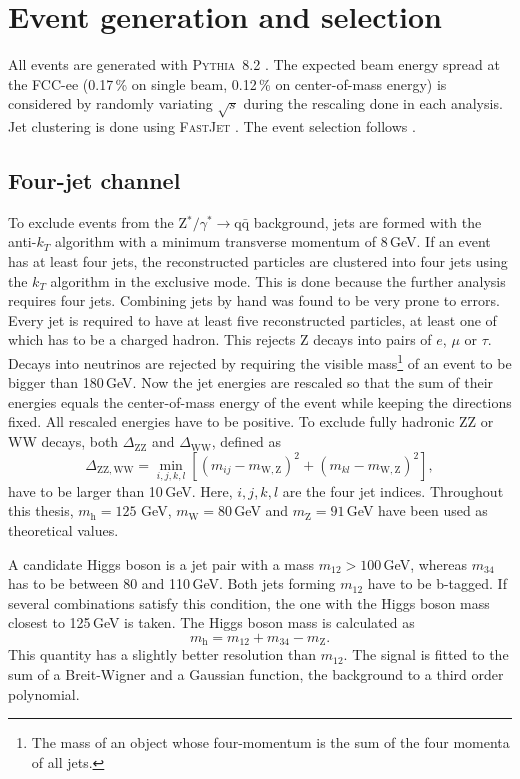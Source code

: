 \section{Event generation and selection}
All events are generated with \textsc{Pythia~8.2} \cite{pythia82}. The expected beam energy spread at the FCC-ee (0.17\,\% on single beam, 0.12\,\% on center-of-mass energy) is considered by randomly variating $\sqrt{s}$ during the rescaling done in each analysis. Jet clustering is done using \textsc{FastJet} \cite{fastjet}.
The event selection follows \cite{lep3-note}.

\subsection{Four-jet channel}
To exclude events from the Z$^*/\gamma^* \rightarrow \mathrm{q\bar{q}}$ background, jets are formed with the anti-$k_T$ algorithm \cite{antikt_algo} with a minimum transverse momentum of 8\,GeV. If an event has at least four jets, the reconstructed particles are clustered into four jets using the $k_T$ algorithm \cite{kt_algo} in the exclusive mode. This is done because the further analysis requires four jets. Combining jets by hand was found  to be very prone to errors.
Every jet is required to have at least five reconstructed particles,  at least one of which has to be a charged hadron. This rejects Z decays into pairs of $e$, $\mu$ or $\tau$. Decays into neutrinos are rejected by requiring the visible mass\footnote{The mass of an object whose four-momentum is the sum of the four momenta of all jets.} of an event to be bigger than 180\,GeV. Now the jet energies are rescaled so that the sum of their energies equals the center-of-mass energy of the event while keeping the directions fixed. 
All rescaled energies have to be positive.
To exclude fully hadronic ZZ or WW decays, both $\Delta_\mathrm{ZZ}$ and $\Delta_\mathrm{WW}$, defined as
\begin{equation}
\Delta_\mathrm{ZZ, WW} = \min_{i, j, k, l} [(m_{ij} - m_\mathrm{W, Z})^2 + (m_{kl} - m_\mathrm{W, Z})^2],
\end{equation}
have to be larger than 10\,GeV. Here, $i, j, k, l$ are the four jet indices. Throughout this thesis, $m_\mathrm{h} = 125\,$\,GeV, $m_\mathrm{W} = 80$\,GeV and  $m_\mathrm{Z} = 91$\,GeV have been used as theoretical values.

A candidate Higgs boson is a jet pair with a mass $m_{12} > 100$\,GeV, whereas $m_{34}$ has to be between 80 and 110\,GeV. Both jets forming $m_{12}$ have to be b-tagged. If several combinations satisfy this condition, the one with the Higgs boson mass closest to 125\,GeV is taken. The Higgs boson mass is calculated as
\begin{equation}
  m_\mathrm{h} = m_{12} + m_{34} - m_\mathrm{Z}.
\label{eq:higgsmass}
\end{equation}
This quantity has a slightly better resolution than $m_{12}$.
The signal is fitted to the sum of a Breit-Wigner and a Gaussian function, the background to a third order polynomial.